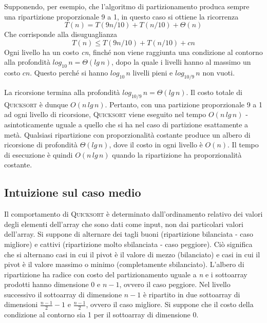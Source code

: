\documentclass[10pt, a4paper]{report}
\begin{document}
Supponendo, per esempio, che l'algoritmo di partizionamento produca sempre una ripartizione proporzionale 9 a 1, in questo caso si ottiene la ricorrenza
\begin{equation*}
T(n) = T(9n/10) + T(n/10) + \Theta(n) 
\end{equation*}
Che corrisponde alla disuguaglianza
\begin{equation*}
T(n) \leq T(9n/10) + T(n/10) + cn
\end{equation*}
Ogni livello ha un costo \textit{cn}, finché non viene raggiunta una condizione al contorno alla profondità $log_{10}{\,n} = \Theta(lg\,n)$, dopo la quale i livelli hanno al massimo un costo $cn$. Questo perché si hanno $log_{10}{\,n}$ livelli pieni e $log_{10/9}{\,n}$ non vuoti.

La ricorsione termina alla profondità $log_{10/9}{\,n} = \Theta(lg\,n)$. Il costo totale di \textsc{Quicksort} è dunque $O(n\,lg\,n)$. Pertanto, con una partizione proporzionale 9 a 1 ad ogni livello di ricorsione, \textsc{Quicksort} viene eseguito nel tempo $O(n\,lg\,n)$ - asintoticamente uguale a quello che si ha nel caso di partizione esattamente a metà. Qualsiasi ripartizione con proporzionalità costante produce un albero di ricorsione di profondità $\Theta(lg\,n)$, dove il costo in ogni livello è $O(n)$. Il tempo di esecuzione è quindi $O(n\,lg\,n)$ quando la ripartizione ha proporzionalità costante.
\subsection{Intuizione sul caso medio}
Il comportamento di \textsc{Quicksort} è determinato dall'ordinamento relativo dei valori degli elementi dell'array che sono dati come input, non dai particolari valori dell'array. Si suppone di alternare dei tagli buoni (ripartizione bilanciata - caso migliore) e cattivi (ripartizione molto sbilanciata - caso peggiore). Ciò significa che si alternano casi in cui il pivot è il valore di mezzo (bilanciato) e casi in cui il pivot è il valore massimo o minimo (completamente sbilanciato). L'albero di ripartizione ha radice con costo del partizionamento uguale a \textit{n} e i sottoarray prodotti hanno dimensione $0$ e $n - 1$, ovvero il caso peggiore. Nel livello successivo il sottoarray di dimensione $n - 1$ è ripartito in due sottoarray di dimensioni $\frac{n - 1}{2} - 1$ e $\frac{n - 1}{2}$, ovvero il caso migliore. Si suppone che il costo della condizione al contorno sia 1 per il sottoarray di dimensione 0.
\end{document}
